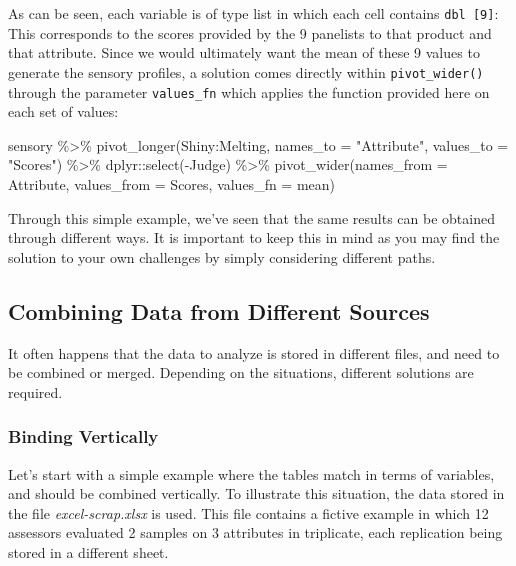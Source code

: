 \documentclass[
]{krantz}
\makeatletter
\newenvironment{Shaded}{\begin{snugshade}}{\end{snugshade}}
\newcommand{\AttributeTok}[1]{\textcolor[rgb]{0.61,0.61,0.61}{#1}}
\newcommand{\FunctionTok}[1]{\textcolor[rgb]{0,0,0}{#1}}
\newcommand{\NormalTok}[1]{#1}
\newcommand{\SpecialCharTok}[1]{\textcolor[rgb]{0,0,0}{#1}}
\newcommand{\StringTok}[1]{\textcolor[rgb]{0.5,0.5,0.5}{#1}}
\newenvironment{kframe}{%
\medskip{}
\setlength{\fboxsep}{.8em}
 \def\at@end@of@kframe{}%
 \ifinner\ifhmode%
  \def\at@end@of@kframe{\end{minipage}}%
  \begin{minipage}{\columnwidth}%
 \fi\fi%
 \def\FrameCommand##1{\hskip\@totalleftmargin \hskip-\fboxsep
 \colorbox{shadecolor}{##1}\hskip-\fboxsep
     \hskip-\linewidth \hskip-\@totalleftmargin \hskip\columnwidth}%
 \MakeFramed {\advance\hsize-\width
   \@totalleftmargin\z@ \linewidth\hsize
   \@setminipage}}%
 {\par\unskip\endMakeFramed%
 \at@end@of@kframe}
\renewenvironment{Shaded}{\begin{kframe}}{\end{kframe}}
\makeatother
\begin{document}
As can be seen, each variable is of type list in which each cell contains \texttt{dbl\ {[}9{]}}: This corresponds to the scores provided by the 9 panelists to that product and that attribute. Since we would ultimately want the mean of these 9 values to generate the sensory profiles, a solution comes directly within \texttt{pivot\_wider()} through the parameter \texttt{values\_fn} which applies the function provided here on each set of values:

\begin{Shaded}
\begin{Highlighting}[]
\NormalTok{sensory }\SpecialCharTok{\%\textgreater{}\%}
  \FunctionTok{pivot\_longer}\NormalTok{(Shiny}\SpecialCharTok{:}\NormalTok{Melting, }
               \AttributeTok{names\_to =} \StringTok{"Attribute"}\NormalTok{, }\AttributeTok{values\_to =} \StringTok{"Scores"}\NormalTok{) }\SpecialCharTok{\%\textgreater{}\%}
\NormalTok{  dplyr}\SpecialCharTok{::}\FunctionTok{select}\NormalTok{(}\SpecialCharTok{{-}}\NormalTok{Judge) }\SpecialCharTok{\%\textgreater{}\%}
  \FunctionTok{pivot\_wider}\NormalTok{(}\AttributeTok{names\_from =}\NormalTok{ Attribute, }\AttributeTok{values\_from =}\NormalTok{ Scores, }
              \AttributeTok{values\_fn =}\NormalTok{ mean)}
\end{Highlighting}
\end{Shaded}

Through this simple example, we've seen that the same results can be obtained through different ways. It is important to keep this in mind as you may find the solution to your own challenges by simply considering different paths.

\hypertarget{combining-data-from-different-sources}{%
\subsection{Combining Data from Different Sources}\label{combining-data-from-different-sources}}

It often happens that the data to analyze is stored in different files, and need to be combined or merged. Depending on the situations, different solutions are required.

\hypertarget{binding-vertically}{%
\subsubsection{Binding Vertically}\label{binding-vertically}}

Let's start with a simple example where the tables match in terms of variables, and should be combined vertically. To illustrate this situation, the data stored in the file \emph{excel-scrap.xlsx} is used. This file contains a fictive example in which 12 assessors evaluated 2 samples on 3 attributes in triplicate, each replication being stored in a different sheet.
\end{document}
